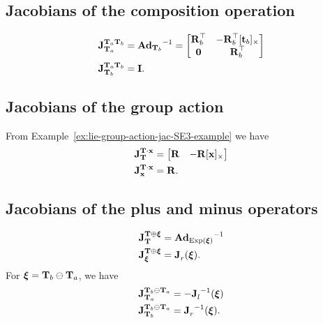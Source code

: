\subsection{Jacobians of the composition operation}
\begin{align}
  \jac{\matT_a \matT_b}{\matT_a} &= {\mAd_{\matT_b}}^{-1} = 
  \begin{bmatrix}
    \matR_b\trans & -\matR_b\trans \skewsymm{\vect_b}\\
    \matr{0} & \matR_b\trans
  \end{bmatrix}\\
  \jac{\matT_a \matT_b}{\matT_b} &= \matI.
\end{align}

\subsection{Jacobians of the group action}
From Example~\ref{ex:lie-group-action-jac-SE3-example} we have
\begin{align}
  \jac{\matT \cdot \vecx}{\matT} &= 
  \begin{bmatrix}
    \matR & -\matR\skewsymm{\vecx}
  \end{bmatrix}\\
  \jac{\matT \cdot \vecx}{\vecx} &= \matR.
\end{align}

\subsection{Jacobians of the plus and minus operators}
\begin{align}
  \jac{\matT \oplus \vecxi}{\matT} &= {\mAd_{\Exp(\vecxi)}}^{-1}\\
  \jac{\matT \oplus \vecxi}{\vecxi} &= \jac{}{r}(\vecxi).
\end{align}
For $\vecxi = \matT_b \ominus \matT_a$, we have
\begin{align}
  \jac{\matT_b \ominus \matT_a}{\matT_a} &= -\jac{}{l}^{-1}(\vecxi)  \label{eq:jacobian-minus-x-SE3}\\
  \jac{\matT_b \ominus \matT_a}{\matT_b} &= \jac{}{r}^{-1}(\vecxi).
\end{align}
